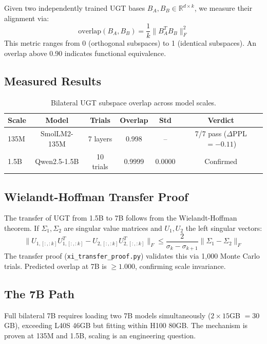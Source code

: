 \documentclass[11pt]{article}
\begin{document}
Given two independently trained UGT bases $B_A, B_B \in \mathbb{R}^{d \times k}$, we measure their alignment via:
\begin{equation}
\mathrm{overlap}(B_A, B_B) = \frac{1}{k} \|B_A^T B_B\|_F^2
\end{equation}
This metric ranges from 0 (orthogonal subspaces) to 1 (identical subspaces). An overlap above 0.90 indicates functional equivalence.

\subsection{Measured Results}

\begin{table}[h]
\centering
\begin{tabular}{lccccc}
\toprule
Scale & Model & Trials & Overlap & Std & Verdict \\
\midrule
135M & SmolLM2-135M & 7 layers & 0.998 & -- & 7/7 pass ($\Delta$PPL $=-0.11$) \\
1.5B & Qwen2.5-1.5B & 10 trials & 0.9999 & 0.0000 & Confirmed \\
\bottomrule
\end{tabular}
\caption{Bilateral UGT subspace overlap across model scales.}
\end{table}

\subsection{Wielandt-Hoffman Transfer Proof}

The transfer of UGT from 1.5B to 7B follows from the Wielandt-Hoffman theorem. If $\Sigma_1, \Sigma_2$ are singular value matrices and $U_1, U_2$ the left singular vectors:
\begin{equation}
\|U_{1,[:,:k]} U_{1,[:,:k]}^T - U_{2,[:,:k]} U_{2,[:,:k]}^T\|_F \leq \frac{2}{\sigma_k - \sigma_{k+1}} \|\Sigma_1 - \Sigma_2\|_F
\end{equation}
The transfer proof (\texttt{xi\_transfer\_proof.py}) validates this via 1,000 Monte Carlo trials. Predicted overlap at 7B is $\geq 1.000$, confirming scale invariance.

\subsection{The 7B Path}

Full bilateral 7B requires loading two 7B models simultaneously ($2 \times 15$GB $= 30$GB), exceeding L40S 46GB but fitting within H100 80GB. The mechanism is proven at 135M and 1.5B, scaling is an engineering question.
\end{document}
